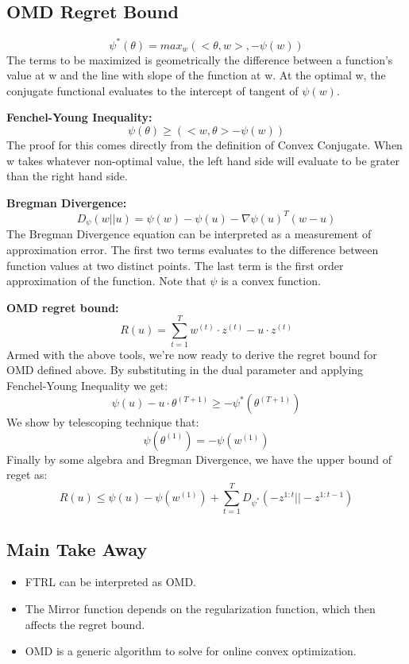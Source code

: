 \documentclass[11pt]{article}
\begin{document}
\subsection{OMD Regret Bound}

\normalfont
\[\psi^*(\theta) = max_{w}(<\theta, w>, - \psi(w))\]
The terms to be maximized is geometrically the difference between a function's value at w and the line with slope of the function at w. At the optimal w, the conjugate functional evaluates to the intercept of tangent of \(\psi(w)\). 

\normalfont\textbf{Fenchel-Young Inequality:}
\normalfont
\[\psi(\theta) \geq (<w, \theta> - \psi(w))\]
The proof for this comes directly from the definition of Convex Conjugate. When w takes whatever non-optimal value, the left hand side will evaluate to be grater than the right hand side.

\normalfont\textbf{Bregman Divergence:}
\normalfont
\[D_\psi(w||u) = \psi(w) - \psi(u) - \nabla\psi(u)^T(w - u)\]
The Bregman Divergence equation can be interpreted as a measurement of approximation error. The first two terms evaluates to the difference between function values at two distinct points. The last term is the first order approximation of the function. Note that \(\psi\) is a convex function.

\normalfont\textbf{OMD regret bound:}
\normalfont
\[R(u) = \sum_{t=1}^T w^{(t)}\cdot z^{(t)} - u \cdot z^{(t)}\]
Armed with the above tools, we're now ready to derive the regret bound for OMD defined above. By substituting in the dual parameter and applying Fenchel-Young Inequality we get:
\[\psi(u) - u \cdot \theta^{(T + 1)} \geq -\psi^*(\theta^{(T + 1)})\]
We show by telescoping technique that:
\[\psi(\theta^{(1)})  = -\psi(w ^ {(1)})\]
Finally by some algebra and Bregman Divergence, we have the upper bound of reget as:
\[R(u) \leq \psi(u) - \psi(w^{(1)}) + \sum_{t=1}^T D_{\psi^*} (-z^{1:t} || -z^{1:t-1})\]

\subsection{Main Take Away}
\begin{itemize}
    \item FTRL can be interpreted as OMD.
    \item The Mirror function depends on the regularization function, which then affects the regret bound.
    \item OMD is a generic algorithm to solve for online convex optimization.
\end{itemize}
\clearpage
\end{document}
